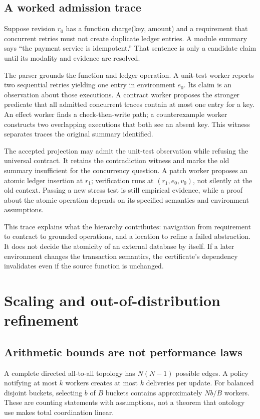 \documentclass[11pt]{article}
\begin{document}
\subsection{A worked admission trace}
Suppose revision $r_0$ has a function \textsf{charge(key, amount)} and a requirement that concurrent retries must not create duplicate ledger entries. A module summary says ``the payment service is idempotent.'' That sentence is only a candidate claim until its modality and evidence are resolved.

The parser grounds the function and ledger operation. A unit-test worker reports two sequential retries yielding one entry in environment $e_0$. Its claim is an observation about those executions. A contract worker proposes the stronger predicate that all admitted concurrent traces contain at most one entry for a key. An effect worker finds a check-then-write path; a counterexample worker constructs two overlapping executions that both see an absent key. This witness separates traces the original summary identified.

The accepted projection may admit the unit-test observation while refusing the universal contract. It retains the contradiction witness and marks the old summary insufficient for the concurrency question. A patch worker proposes an atomic ledger insertion at $r_1$; verification runs at $(r_1,e_0,v_0)$, not silently at the old context. Passing a new stress test is still empirical evidence, while a proof about the atomic operation depends on its specified semantics and environment assumptions.

This trace explains what the hierarchy contributes: navigation from requirement to contract to grounded operations, and a location to refine a failed abstraction. It does not decide the atomicity of an external database by itself. If a later environment changes the transaction semantics, the certificate's dependency invalidates even if the source function is unchanged.

\section{Scaling and out-of-distribution refinement}
\subsection{Arithmetic bounds are not performance laws}
A complete directed all-to-all topology has $N(N-1)$ possible edges. A policy notifying at most $k$ workers creates at most $k$ deliveries per update. For balanced disjoint buckets, selecting $b$ of $B$ buckets contains approximately $Nb/B$ workers. These are counting statements with assumptions, not a theorem that ontology use makes total coordination linear.
\end{document}
